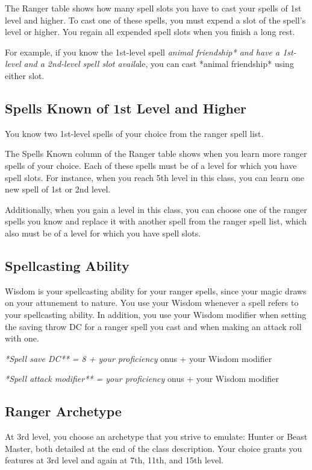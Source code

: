 The Ranger table shows how many spell slots you have to cast your spells of 1st level and higher. To cast one of these spells, you must expend a slot of the spell’s level or higher. You regain all expended spell slots when you finish a long rest.

For example, if you know the 1st-level spell \textit{animal friendship* and have a 1st-level and a 2nd-level spell slot availa}le, you can cast *animal friendship* using either slot.

\subsection{Spells Known of 1st Level and Higher}

You know two 1st-level spells of your choice from the ranger spell list.

The Spells Known column of the Ranger table shows when you learn more ranger spells of your choice. Each of these spells must be of a level for which you have spell slots. For instance, when you reach 5th level in this class, you can learn one new spell of 1st or 2nd level.

Additionally, when you gain a level in this class, you can choose one of the ranger spells you know and replace it with another spell from the ranger spell list, which also must be of a level for which you have spell slots.

\subsection{Spellcasting Ability}

Wisdom is your spellcasting ability for your ranger spells, since your magic draws on your attunement to nature. You use your Wisdom whenever a spell refers to your spellcasting ability. In addition, you use your Wisdom modifier when setting the saving throw DC for a ranger spell you cast and when making an attack roll with one.

\textit{*Spell save DC** = 8 + your proficiency }onus + your Wisdom modifier

\textit{*Spell attack modifier** = your proficiency }onus + your Wisdom modifier

\subsection{Ranger Archetype}

At 3rd level, you choose an archetype that you strive to emulate: Hunter or Beast Master, both detailed at the end of the class description. Your choice grants you features at 3rd level and again at 7th, 11th, and 15th level.

